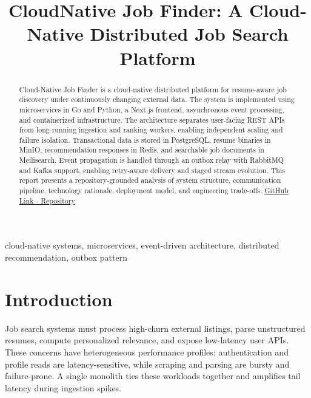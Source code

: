 \documentclass[conference]{IEEEtran}
\begin{document}
\title{CloudNative Job Finder: A Cloud-Native Distributed Job Search Platform}

\author{
\and
{}
\and
{}
}

\maketitle

\begin{abstract}
Cloud-Native Job Finder is a cloud-native distributed platform for resume-aware job discovery under continuously changing external data. The system is implemented using microservices in Go and Python, a Next.js frontend, asynchronous event processing, and containerized infrastructure.
The architecture separates user-facing REST APIs from long-running ingestion and ranking workers, enabling independent scaling and failure isolation. Transactional data is stored in PostgreSQL, resume binaries in MinIO, recommendation responses in Redis, and searchable job documents in Meilisearch.
Event propagation is handled through an outbox relay with RabbitMQ and Kafka support, enabling retry-aware delivery and staged stream evolution.
This report presents a repository-grounded analysis of system structure, communication pipeline, technology rationale, deployment model, and engineering trade-offs.
\href{https://github.com/Team-Parashuram/CloudNative-Job-Finder}{GitHub Link - Repository}
\end{abstract}

\begin{IEEEkeywords} 
cloud-native systems, microservices, event-driven architecture, distributed recommendation, outbox pattern
\end{IEEEkeywords}

\section{Introduction}
Job search systems must process high-churn external listings, parse unstructured resumes, compute personalized relevance, and expose low-latency user APIs. These concerns have heterogeneous performance profiles: authentication and profile reads are latency-sensitive, while scraping and parsing are bursty and failure-prone. A single monolith ties these workloads together and amplifies tail latency during ingestion spikes.
\end{document}
